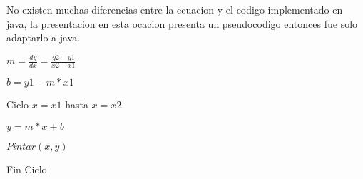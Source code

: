 \documentclass{article}
\begin{document}
No existen muchas diferencias entre la ecuacion
y el codigo implementado en java, la presentacion
en esta ocacion presenta un pseudocodigo entonces
fue solo adaptarlo a java.

\vspace{0.5cm}
$m=\frac{dy}{dx}=\frac{y2-y1}{x2-x1}$

$b=y1-m*x1$

Ciclo $x = x1$ hasta $x = x2$

\hspace{1cm} $y = m*x + b$

\hspace{1cm} $Pintar(x,y)$

Fin Ciclo
\end{document}
